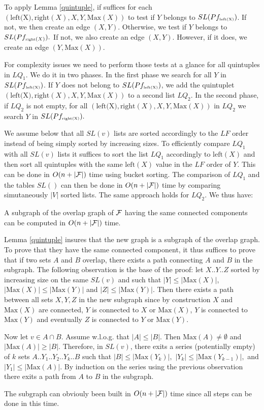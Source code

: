 \documentclass{llncs}
\begin{document}
To apply Lemma \ref{quintuple}, if suffices for each 
$(\mbox{left(X)},\mbox{right}(X),X,Y,\mbox{Max}(X))$  to test if $Y$ belongs to
$SL(Pf_{\mbox{\tiny left(X)}})$. If not, we then create an edge $(X,Y).$
Otherwise, we test if $Y$ belongs to $SL(Pf_{\mbox{\tiny right}(X)}).$ If
not, we also create an edge $(X,Y).$ However, if it does, we create an
edge $(Y,\mbox{Max}(X)).$

For complexity issues we need to perform those tests at a glance for
all quintuples in $LQ_1$. We do it in two phases. In the first phase
we search for all $Y$ in $SL(Pf_{\tiny \mbox{left(X)}})$. If $Y$ does not
belong to $SL(Pf_{\mbox{\tiny left(X)}})$, we add the quintuplet
$(\mbox{left(X)},\mbox{right}(X),X,Y,\mbox{Max}(X))$ to a second list
$LQ_2$. In the second phase, if $LQ_2$ is not empty, for all
 $(\mbox{left(X)},\mbox{right}(X),X,Y,\mbox{Max}(X))$ in
$LQ_2$ we search $Y$ in $SL(Pf_{\mbox{\tiny right(X)}}).$

We assume below that all $SL(v)$ lists are sorted accordingly to the
$LF$ order instead of being simply sorted by increasing sizes. To
efficiently compare $LQ_1$ with all $SL(v)$ lists it suffices to sort
the list $LQ_1$ accordingly to $\mbox{left}(X)$ and then sort all
quintuples with the same $\mbox{left}(X)$ value in the $LF$ order of
$Y.$ This can be done in $O(n+|{\cal F}|)$ time using bucket
sorting. The comparison of $LQ_1$ and the tables $SL()$ can then be
done in $O(n+|{\cal F}|)$ time by comparing simutaneously $|V|$ sorted
lists.  The same approach holds for $LQ_2.$ We thus have:

\begin{theorem}
A subgraph of the overlap graph of ${\cal F}$ having the same
connected components can be computed in $O(n+|{\cal F}|)$ time.
\end{theorem}
\begin{preuve}
Lemma \ref{quintuple} insures that the new graph is a subgraph of the
overlap graph. To prove that they have the same connected component,
it thus suffices to prove that if two sets $A$ and $B$ overlap, there
exists a path connecting $A$ and $B$ in the subgraph. The following
observation is the base of the proof: let $X..Y..Z$ sorted by
increasing size on the same $SL(v)$ and such that $|Y|\leq
|\mbox{Max}(X)|$, $|\mbox{Max}(X)| \leq |\mbox{Max}(Y)|$ and $|Z|\leq
|\mbox{Max}(Y)|.$ Then there exists a path between all sets $X,Y,Z$ in
the new subgraph since by construction $X$ and $\mbox{Max}(X)$ are
connected, $Y$ is connected to $X$ or $\mbox{Max}(X)$, $Y$ is
connected to $\mbox{Max}(Y)$ and eventually $Z$ is connected to $Y$ or
$\mbox{Max}(Y)$.


Now let $v \in A \cap B.$ Assume w.l.o.g. that $|A|\leq |B|.$ Then
$\mbox{Max}(A)\not=\emptyset$ and $|\mbox{Max}(A)| \geq |B|.$ Therefore,
in $SL(v)$, there exits a series (potentially empty) of $k$ sets
$A..Y_1..Y_2..Y_k..B$ such that $|B| \leq |\mbox{Max}(Y_k)|,$ $|Y_k|
\leq |\mbox{Max}(Y_{k-1})|,$ and $|Y_1| \leq |\mbox{Max}(A)|.$ By
induction on the series using the previous observation there exits a
path from $A$ to $B$ in the subgraph.

The subgraph can obviouly been built in $O(n+|{\cal F}|)$ time since
all steps can be done in this time.
\end{preuve}
\end{document}
